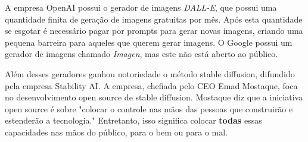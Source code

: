 A empresa OpenAI possui o gerador de imagens \textit{DALL-E}, que possui uma quantidade finita de geração de imagens gratuitas por mês. Após esta quantidade se esgotar é necessário pagar por prompts para gerar novas imagens, criando uma pequena barreira para aqueles que querem gerar imagens. O Google possui um gerador de imagens chamado \textit{Imagen}, mas este não está aberto ao público.

Além desses geradores ganhou notoriedade o método stable diffusion, difundido pela empresa Stability AI. A empresa, chefiada pelo CEO Emad Mostaque, foca no desenvolvimento open source de stable diffusion. Mostaque diz que a iniciativa open source é sobre "colocar o controle nas mãos das pessoas que construirão e estenderão a tecnologia." Entretanto, isso significa colocar \textbf{todas} essas capacidades nas mãos do público, para o bem ou para o mal.

